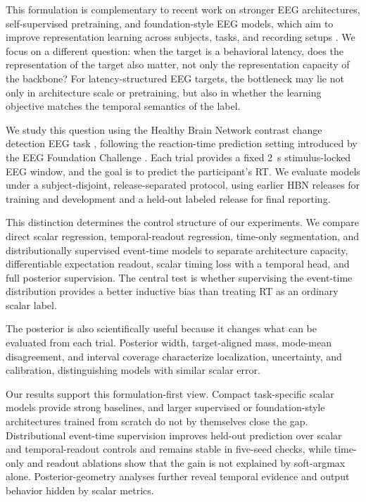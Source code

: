 \documentclass[12pt]{article}
\begin{document}
This formulation is complementary to recent work on stronger EEG architectures, self-supervised pretraining, and foundation-style EEG models, which aim to improve representation learning across subjects, tasks, and recording setups \citep{wang2024eegpt,Jiang2024LaBraM,Chen2024EEGFormer,Wang2025EEGMamba,ElOuahidi2025REVE,Yue2024BrainGPT}. We focus on a different question: when the target is a behavioral latency, does the representation of the target also matter, not only the representation capacity of the backbone? For latency-structured EEG targets, the bottleneck may lie not only in architecture scale or pretraining, but also in whether the learning objective matches the temporal semantics of the label.

We study this question using the Healthy Brain Network contrast change detection EEG task \citep{Shirazi2024HBNEEG}, following the reaction-time prediction setting introduced by the EEG Foundation Challenge \citep{EEGFoundationChallengeArxiv2025,EEGChallengeWebsite2025}. Each trial provides a fixed 2~s stimulus-locked EEG window, and the goal is to predict the participant's RT. We evaluate models under a subject-disjoint, release-separated protocol, using earlier HBN releases for training and development and a held-out labeled release for final reporting.

This distinction determines the control structure of our experiments. We compare direct scalar regression, temporal-readout regression, time-only segmentation, and distributionally supervised event-time models to separate architecture capacity, differentiable expectation readout, scalar timing loss with a temporal head, and full posterior supervision. The central test is whether supervising the event-time distribution provides a better inductive bias than treating RT as an ordinary scalar label.

The posterior is also scientifically useful because it changes what can be evaluated from each trial. Posterior width, target-aligned mass, mode-mean disagreement, and interval coverage characterize localization, uncertainty, and calibration, distinguishing models with similar scalar error.

Our results support this formulation-first view. Compact task-specific scalar models provide strong baselines, and larger supervised or foundation-style architectures trained from scratch do not by themselves close the gap. Distributional event-time supervision improves held-out prediction over scalar and temporal-readout controls and remains stable in five-seed checks, while time-only and readout ablations show that the gain is not explained by soft-argmax alone. Posterior-geometry analyses further reveal temporal evidence and output behavior hidden by scalar metrics.
\end{document}
